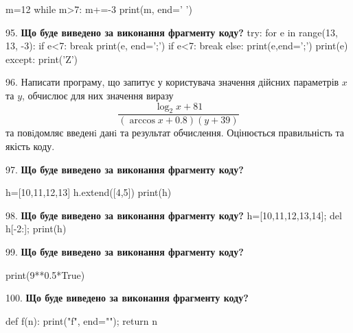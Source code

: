 \documentclass[11pt]{article}
\begin{document}
m=12
while m>7:
    m+=-3
print(m, end=' ')

\par\vspace{5mm}
95. \textbf{Що буде виведено за виконання фрагменту коду?}
try:
    for e in range(13, 13, -3):
        if e<7:
            break
        print(e, end=';')
        if e<7:
            break
    else:
        print(e,end=';')
    print(e)
except:
    print('Z')
\par\vspace{5mm}
96. 
Написати програму, що запитує у користувача значення дійсних параметрів $x$ та $y$, обчислює для них значення виразу 
$$\frac{\log_{2} x + 81}{(\arccos x + 0.8) (y + 39)}$$ 
та повiдомляє введенi данi та результат обчислення.
 Оцінюється правильність та якість коду.

\par\vspace{5mm}
97. \textbf{Що буде виведено за виконання фрагменту коду?}

h=[10,11,12,13]
h.extend([4,5])
print(h)

\par\vspace{5mm}
98. \textbf{Що буде виведено за виконання фрагменту коду?}
h=[10,11,12,13,14]; del h[-2:]; print(h)\par\vspace{5mm}
99. \textbf{Що буде виведено за виконання фрагменту коду?}

print(9**0.5*True)
\par\vspace{5mm}
100. \textbf{Що буде виведено за виконання фрагменту коду?}

def f(n):
    print("f", end="");
    return n
\end{document}
